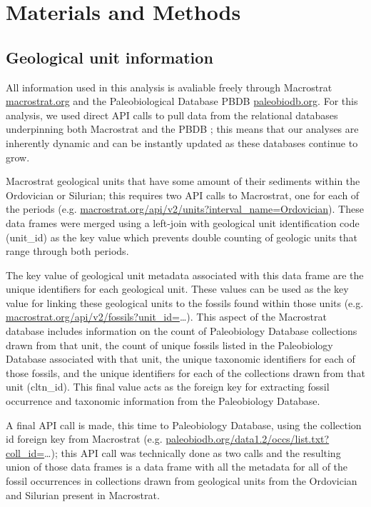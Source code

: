 \documentclass[12pt,letterpaper]{article}
\begin{document}
\section{Materials and Methods}

\subsection{Geological unit information}

All information used in this analysis is avaliable freely through Macrostrat \url{macrostrat.org} and the Paleobiological Database PBDB \url{paleobiodb.org}. For this analysis, we used direct API calls to pull data from the relational databases underpinning both Macrostrat and the PBDB \citep{Peters2016,Peters2018}; this means that our analyses are inherently dynamic and can be instantly updated as these databases continue to grow.

Macrostrat geological units that have some amount of their sediments within the Ordovician or Silurian; this requires two API calls to Macrostrat, one for each of the periods (e.g. \url{macrostrat.org/api/v2/units?interval_name=Ordovician}). These data frames were merged using a left-join with geological unit identification code (unit\_id) as the key value which prevents double counting of geologic units that range through both periods. 

The key value of geological unit metadata associated with this data frame are the unique identifiers for each geological unit. These values can be used as the key value for linking these geological units to the fossils found within those units (e.g. \url{macrostrat.org/api/v2/fossils?unit\_id=}\dots). This aspect of the Macrostrat database includes information on the count of Paleobiology Database collections drawn from that unit, the count of unique fossils listed in the Paleobiology Database associated with that unit, the unique taxonomic identifiers for each of those fossils, and the unique identifiers for each of the collections drawn from that unit (cltn\_id). This final value acts as the foreign key for extracting fossil occurrence and taxonomic information from the Paleobiology Database.

A final API call is made, this time to Paleobiology Database, using the collection id foreign key from Macrostrat (e.g. \url{paleobiodb.org/data1.2/occs/list.txt?coll\_id=}\dots); this API call was technically done as two calls and the resulting union of those data frames is a data frame with all the metadata for all of the fossil occurrences in collections drawn from geological units from the Ordovician and Silurian present in Macrostrat.
\end{document}
